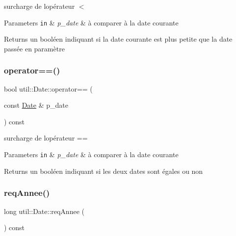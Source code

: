 surcharge de l\textquotesingle{}opérateur $<$ 


\begin{DoxyParams}[1]{Parameters}
\mbox{\tt in}  & {\em p\+\_\+date} & à comparer à la date courante \\
\hline
\end{DoxyParams}
\begin{DoxyReturn}{Returns}
un booléen indiquant si la date courante est plus petite que la date passée en paramètre 
\end{DoxyReturn}
\mbox{\label{classutil_1_1Date_a8114f8e40cee24e1d7a58b910e8f4637}} 
\subsubsection{\texorpdfstring{operator==()}{operator==()}}
{\footnotesize\ttfamily bool util\+::\+Date\+::operator== (\begin{DoxyParamCaption}\item[{const \hyperlink{classutil_1_1Date}{Date} \&}]{p\+\_\+date }\end{DoxyParamCaption}) const}



surcharge de l\textquotesingle{}opérateur == 


\begin{DoxyParams}[1]{Parameters}
\mbox{\tt in}  & {\em p\+\_\+date} & à comparer à la date courante \\
\hline
\end{DoxyParams}
\begin{DoxyReturn}{Returns}
un booléen indiquant si les deux dates sont égales ou non 
\end{DoxyReturn}
\mbox{\label{classutil_1_1Date_aa7c4b428456da55a2e3769e93ad9bb8d}} 
\subsubsection{\texorpdfstring{req\+Annee()}{reqAnnee()}}
{\footnotesize\ttfamily long util\+::\+Date\+::req\+Annee (\begin{DoxyParamCaption}{ }\end{DoxyParamCaption}) const}



